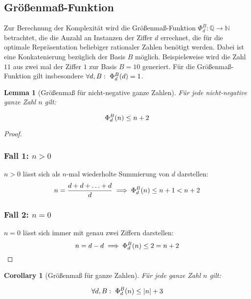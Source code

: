 \documentclass{article}
\newtheorem{corollary}{Corollary}[theorem]
\newtheorem{lemma}[theorem]{Lemma}
\theoremstyle{nonumberplain}
\newtheorem{proof}{Beweis}
\begin{document}
\subsection{Größenmaß-Funktion}

Zur Berechnung der Komplexität wird die Größenmaß-Funktion \(\Phi_{d}^{B} : \mathbb{Q} \to \mathbb{N}\) betrachtet, die die Anzahl an Instanzen der Ziffer \(d\) errechnet, die für die optimale Repräsentation beliebiger rationaler Zahlen benötigt werden. Dabei ist eine Konkatenierung bezüglich der Basis \(B\) möglich. Beispielsweise wird die Zahl \(11\) aus zwei mal der Ziffer \(1\)  zur Basis \(B=10\) generiert. Für die Größenmaß-Funktion gilt insbesondere \(\forall d, B:\ \Phi_{d}^{B}(d) = 1\).

\begin{lemma}[Größenmaß für nicht-negative ganze Zahlen]\label{lemma:measure_linear_nonnegative}
    Für jede nicht-negative ganze Zahl \(n\) gilt:

    \[\Phi_{d}^{B}(n) \leq n + 2\]
\end{lemma}
\begin{proof}
    \subsubsection*{Fall 1: \(n > 0\)}
    
    \(n > 0\) lässt sich als \(n\)-mal wiederholte Summierung von \(d\) darstellen:
    \[n = \frac{d+d+\ldots+d}{d} \implies \Phi_{d}^{B}(n) \leq n + 1 < n + 2\]

    \subsubsection*{Fall 2: \(n = 0\)}
        
    \(n = 0\) lässt sich immer mit genau zwei Ziffern darstellen:
    \[n = d - d \implies \Phi_{d}^{B}(n) \leq 2 = n + 2\]
\end{proof}
\begin{corollary}[Größenmaß für ganze Zahlen]\label{lemma:measure_linear}
    Für jede ganze Zahl \(n\) gilt:

    \[\forall d, B:\  \Phi_{d}^{B}(n) \leq |n| + 3\]
\end{corollary}
\end{document}
